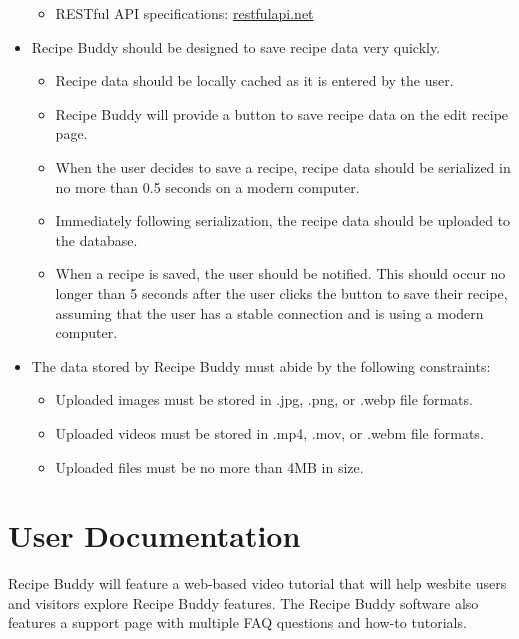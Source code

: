 \documentclass{scrreprt}
\begin{document}
\begin{itemize}
\begin{itemize}
        \item \gls{RESTful API} specifications: \href{https://restfulapi.net/}{restfulapi.net}
    
    \end{itemize}

    \item \gls{Recipe Buddy} should be designed to save recipe data very quickly.
    \begin{itemize}

        \item Recipe data should be locally cached as it is entered by the user.
        \item \gls{Recipe Buddy} will provide a button to save recipe data on the edit recipe page.
        \item When the user decides to save a recipe, recipe data should be \gls{serialized} in no more than 0.5 seconds on a modern computer.
        \item Immediately following \gls{serialization}, the recipe data should be uploaded to the database.
        \item When a recipe is saved, the user should be notified. This should occur no longer than 5 seconds after the user clicks the button to save their recipe, assuming that the user has a stable connection and is using a modern computer.

    \end{itemize}

    \item The data stored by \gls{Recipe Buddy} must abide by the following constraints:
    \begin{itemize}

        \item Uploaded images must be stored in .jpg, .png, or .webp file formats.
        \item Uploaded videos must be stored in .mp4, .mov, or .webm file formats.
        \item Uploaded files must be no more than 4MB in size.

    \end{itemize}

\end{itemize}

\section{User Documentation}
\gls{Recipe Buddy} will feature a web-based video tutorial that will help wesbite users and visitors explore \gls{Recipe Buddy} features. The \gls{Recipe Buddy} software also features a support page with multiple FAQ questions and how-to tutorials.
\end{document}
